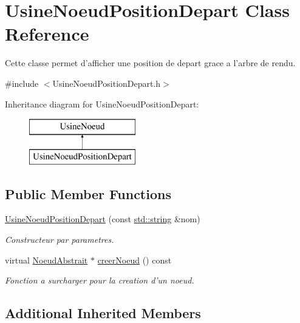 \hypertarget{class_usine_noeud_position_depart}{\section{Usine\-Noeud\-Position\-Depart Class Reference}
\label{class_usine_noeud_position_depart}
}


Cette classe permet d'afficher une position de depart grace a l'arbre de rendu.  




{\ttfamily \#include $<$Usine\-Noeud\-Position\-Depart.\-h$>$}

Inheritance diagram for Usine\-Noeud\-Position\-Depart\-:\begin{figure}[H]
\begin{center}
\leavevmode
\includegraphics[height=2.000000cm]{class_usine_noeud_position_depart}
\end{center}
\end{figure}
\subsection*{Public Member Functions}
\begin{DoxyCompactItemize}
\item 
\hyperlink{group__inf2990_gaa7bf2ec758b59b54e0776c30755478b8}{Usine\-Noeud\-Position\-Depart} (const \hyperlink{glew_8h_ae84541b4f3d8e1ea24ec0f466a8c568b}{std\-::string} \&nom)
\begin{DoxyCompactList}\small\item\em Constructeur par parametres. \end{DoxyCompactList}\item 
virtual \hyperlink{class_noeud_abstrait}{Noeud\-Abstrait} $\ast$ \hyperlink{group__inf2990_ga7406e1b6360fc291108fe2f4e6f9182c}{creer\-Noeud} () const 
\begin{DoxyCompactList}\small\item\em Fonction a surcharger pour la creation d'un noeud. \end{DoxyCompactList}\end{DoxyCompactItemize}
\subsection*{Additional Inherited Members}



